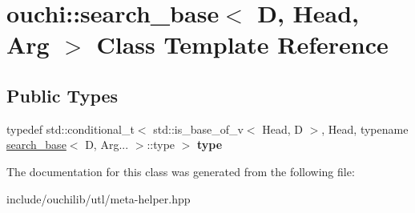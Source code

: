 \hypertarget{classouchi_1_1search__base}{}\section{ouchi\+::search\+\_\+base$<$ D, Head, Arg $>$ Class Template Reference}
\label{classouchi_1_1search__base}
\subsection*{Public Types}
\begin{DoxyCompactItemize}
\item 
\mbox{\label{classouchi_1_1search__base_a54fc2a8a2d272bef414dda62da920534}} 
typedef std\+::conditional\+\_\+t$<$ std\+::is\+\_\+base\+\_\+of\+\_\+v$<$ Head, D $>$, Head, typename \mbox{\hyperlink{classouchi_1_1search__base}{search\+\_\+base}}$<$ D, Arg... $>$\+::type $>$ {\bfseries type}
\end{DoxyCompactItemize}


The documentation for this class was generated from the following file\+:\begin{DoxyCompactItemize}
\item 
include/ouchilib/utl/meta-\/helper.\+hpp\end{DoxyCompactItemize}
